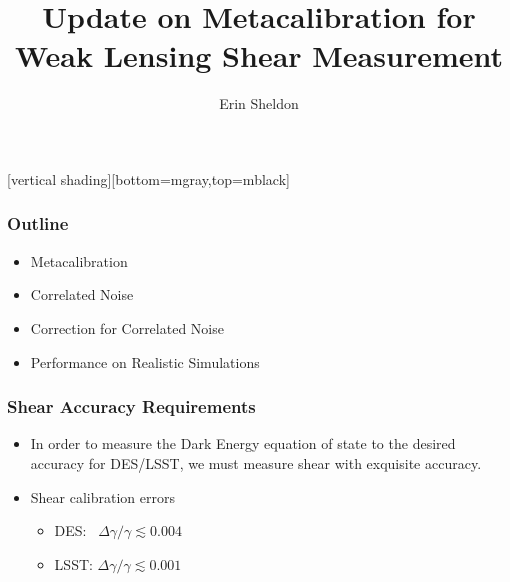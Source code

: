 \documentclass{beamer}
\title{Update on Metacalibration for Weak Lensing Shear Measurement}
\author{Erin Sheldon}
\institute{Brookhaven National Laboratory}
\begin{document}
\frame{\titlepage}


[vertical shading][bottom=mgray,top=mblack]

\frame
{
    \frametitle{Outline}

 
    \begin{itemize}

        \item Metacalibration

        \item Correlated Noise

        \item Correction for Correlated Noise

        \item Performance on Realistic Simulations

    \end{itemize}

}

\frame
{
    \frametitle{Shear Accuracy Requirements}

 
    \begin{itemize}

        \item In order to measure the Dark Energy equation of state
            to the desired accuracy for DES/LSST, we must measure
            shear with exquisite accuracy.

        \item Shear calibration errors
            \begin{itemize}
            
                \item {\color{lightskyblue} DES}:~ $\Delta \gamma/\gamma \lesssim 0.004$
                \item {\color{brightred} LSST}: $\Delta \gamma/\gamma \lesssim 0.001$

            \end{itemize}


    \end{itemize}

}
\end{document}
